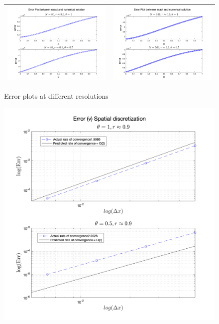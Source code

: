 \documentclass[11pt]{article}
\begin{document}
\begin{enumerate}
\begin{enumerate}
\begin{figure}[htp]
\begin{tabular}{|c|c|}
    \includegraphics[width=3.5in]{N3} & \includegraphics[width=3.5in]{N4}\\
    \hline
    \end{tabular}
    \caption{Error plots at different resolutions}
    \label{fig:q22}
    \end{figure}
    \begin{figure}[htp]
    \centering
    \includegraphics[width=5in]{ErrPlot}

\end{figure}
\end{enumerate}
\end{enumerate}
\end{document}
